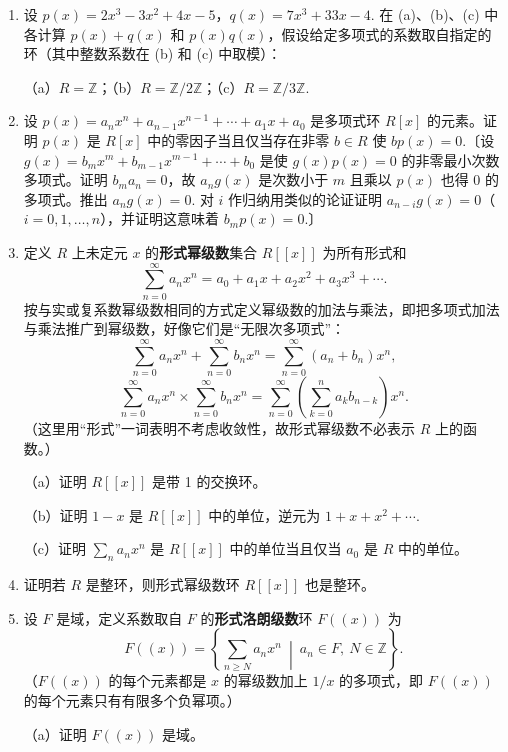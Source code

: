 \begin{enumerate}
\item 设 \(p(x) = 2x^3 - 3x^2 + 4x - 5\)，\(q(x) = 7x^3 + 33x - 4\). 在 (a)、(b)、(c) 中各计算 \(p(x)+q(x)\) 和 \(p(x)q(x)\)，假设给定多项式的系数取自指定的环（其中整数系数在 (b) 和 (c) 中取模）：

（a）\(R = \mathbb{Z}\)；（b）\(R = \mathbb{Z}/2\mathbb{Z}\)；（c）\(R = \mathbb{Z}/3\mathbb{Z}\).

\item 设 \(p(x) = a_nx^n + a_{n-1}x^{n-1} + \cdots + a_1x + a_0\) 是多项式环 \(R[x]\) 的元素。证明 \(p(x)\) 是 \(R[x]\) 中的零因子当且仅当存在非零 \(b \in R\) 使 \(bp(x) = 0\).〔设 \(g(x) = b_mx^m + b_{m-1}x^{m-1} + \cdots + b_0\) 是使 \(g(x)p(x) = 0\) 的非零最小次数多项式。证明 \(b_ma_n = 0\)，故 \(a_ng(x)\) 是次数小于 \(m\) 且乘以 \(p(x)\) 也得 0 的多项式。推出 \(a_ng(x) = 0\). 对 \(i\) 作归纳用类似的论证证明 \(a_{n-i}g(x) = 0\)（\(i = 0, 1, \ldots, n\)），并证明这意味着 \(b_mp(x) = 0\).〕

\item 定义 \(R\) 上未定元 \(x\) 的\textbf{形式幂级数}集合 \(R[[x]]\) 为所有形式和
\[
\sum_{n=0}^{\infty} a_nx^n = a_0 + a_1x + a_2x^2 + a_3x^3 + \cdots.
\]
按与实或复系数幂级数相同的方式定义幂级数的加法与乘法，即把多项式加法与乘法推广到幂级数，好像它们是“无限次多项式”：
\[
\sum_{n=0}^{\infty} a_nx^n + \sum_{n=0}^{\infty} b_nx^n = \sum_{n=0}^{\infty}(a_n+b_n)x^n,
\]
\[
\sum_{n=0}^{\infty} a_nx^n \times \sum_{n=0}^{\infty} b_nx^n = \sum_{n=0}^{\infty}\left(\sum_{k=0}^{n} a_kb_{n-k}\right)x^n.
\]
（这里用“形式”一词表明不考虑收敛性，故形式幂级数不必表示 \(R\) 上的函数。）

（a）证明 \(R[[x]]\) 是带 1 的交换环。

（b）证明 \(1-x\) 是 \(R[[x]]\) 中的单位，逆元为 \(1+x+x^2+\cdots\).

（c）证明 \(\sum_{n} a_nx^n\) 是 \(R[[x]]\) 中的单位当且仅当 \(a_0\) 是 \(R\) 中的单位。

\item 证明若 \(R\) 是整环，则形式幂级数环 \(R[[x]]\) 也是整环。

\item 设 \(F\) 是域，定义系数取自 \(F\) 的\textbf{形式洛朗级数}环 \(F((x))\) 为
\[
F((x)) = \left\{\sum_{n \geq N} a_nx^n \ \middle|\ a_n \in F,\ N \in \mathbb{Z}\right\}.
\]
（\(F((x))\) 的每个元素都是 \(x\) 的幂级数加上 \(1/x\) 的多项式，即 \(F((x))\) 的每个元素只有有限多个负幂项。）

（a）证明 \(F((x))\) 是域。


\end{enumerate}
